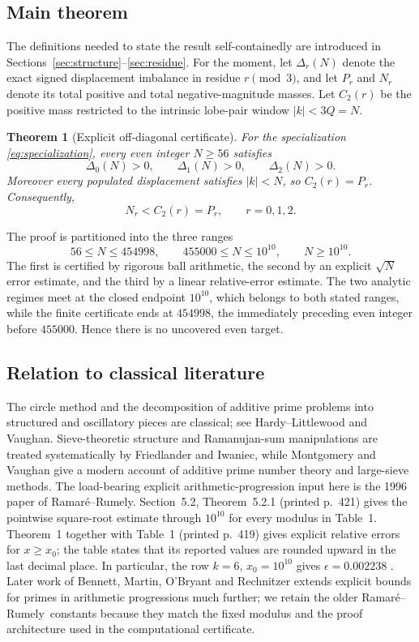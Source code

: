 \documentclass[11pt]{article}
\newtheorem{theorem}{Theorem}[section]
\theoremstyle{definition}
\newcommand{\RR}{Ramar\'{e}--Rumely}
\newcommand{\abs}[1]{\left|#1\right|}
\begin{document}
\subsection{Main theorem}

The definitions needed to state the result self-containedly are introduced in Sections~\ref{sec:structure}--\ref{sec:residue}. For the moment, let $\Delta_r(N)$ denote the exact signed displacement imbalance in residue $r\pmod3$, and let $P_r$ and $N_r$ denote its total positive and total negative-magnitude masses. Let $C_2(r)$ be the positive mass restricted to the intrinsic lobe-pair window $\abs{k}<3Q=N$.

\begin{theorem}[Explicit off-diagonal certificate]\label{thm:main}
For the specialization \eqref{eq:specialization}, every even integer $N\ge56$ satisfies
\[
\Delta_0(N)>0,\qquad \Delta_1(N)>0,\qquad \Delta_2(N)>0.
\]
Moreover every populated displacement satisfies $\abs{k}<N$, so $C_2(r)=P_r$. Consequently,
\[
\boxed{\;N_r<C_2(r)=P_r,\qquad r=0,1,2.\;}
\]
\end{theorem}

The proof is partitioned into the three ranges
\[
56\le N\le454998,\qquad
455000\le N\le10^{10},\qquad
N\ge10^{10}.
\]
The first is certified by rigorous ball arithmetic, the second by an explicit $\sqrt{N}$ error estimate, and the third by a linear relative-error estimate. The two analytic regimes meet at the closed endpoint $10^{10}$, which belongs to both stated ranges, while the finite certificate ends at $454998$, the immediately preceding even integer before $455000$. Hence there is no uncovered even target.

\subsection{Relation to classical literature}

The circle method and the decomposition of additive prime problems into structured and oscillatory pieces are classical; see Hardy--Littlewood and Vaughan. Sieve-theoretic structure and Ramanujan-sum manipulations are treated systematically by Friedlander and Iwaniec, while Montgomery and Vaughan give a modern account of additive prime number theory and large-sieve methods. The load-bearing explicit arithmetic-progression input here is the 1996 paper of \RR. Section~5.2, Theorem~5.2.1 (printed p.~421) gives the pointwise square-root estimate through $10^{10}$ for every modulus in Table~1. Theorem~1 together with Table~1 (printed p.~419) gives explicit relative errors for $x\ge x_0$; the table states that its reported values are rounded upward in the last decimal place. In particular, the row $k=6$, $x_0=10^{10}$ gives $\epsilon=0.002238$ \cite{RamareRumely1996}. Later work of Bennett, Martin, O'Bryant and Rechnitzer extends explicit bounds for primes in arithmetic progressions much further; we retain the older \RR\ constants because they match the fixed modulus and the proof architecture used in the computational certificate.
\end{document}
